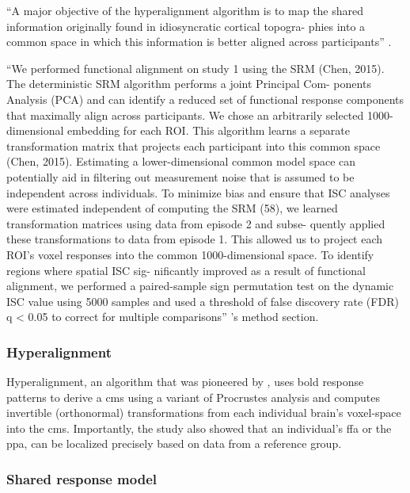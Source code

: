{``A major objective of the hyperalignment algorithm is to map the shared
information originally found in idiosyncratic cortical topogra- phies into a
common space in which this information is better aligned across participants''
\citep{busch2021hybrid}.

``We performed functional alignment on study 1 using the SRM (Chen, 2015). The
deterministic SRM algorithm performs a joint Principal Com- ponents Analysis
(PCA) and can identify a reduced set of functional response components that
maximally align across participants. We chose an arbitrarily selected
1000-dimensional embedding for each ROI. This algorithm learns a separate
transformation matrix that projects each participant into this common space
(Chen, 2015). Estimating a lower-dimensional common model space can potentially
aid in filtering out measurement noise that is assumed to be independent across
individuals. To minimize bias and ensure that ISC analyses were estimated
independent of computing the SRM (58), we learned transformation matrices using
data from episode 2 and subse- quently applied these transformations to data
from episode 1. This allowed us to project each ROI’s voxel responses into the
common 1000-­dimensional space. To identify regions where spatial ISC sig-
nificantly improved as a result of functional alignment, we performed a
paired-sample sign permutation test on the dynamic ISC value using 5000 samples
and used a threshold of false discovery rate (FDR) q < 0.05 to correct for
multiple comparisons'' \citep{chang2021endogenous}'s method section.


\subsubsection{Hyperalignment}

%
Hyperalignment, an algorithm that was pioneered by \citet{haxby2011common}, uses
\ac{bold} response patterns to derive a \ac{cms} using a variant of Procrustes
analysis and computes invertible (orthonormal) transformations from each
individual brain's voxel-space into the \ac{cms}.
%
Importantly, the study also showed that an individual's \ac{ffa} or the
\ac{ppa}, can be localized precisely based on data from a reference group.


\subsubsection{Shared response model}

}
